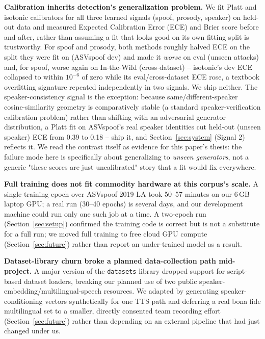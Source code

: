 \documentclass[conference]{IEEEtran}
\begin{document}
\textbf{Calibration inherits detection's generalization problem.} We fit
Platt and isotonic calibrators for all three learned signals (spoof,
prosody, speaker) on held-out data and measured Expected Calibration
Error (ECE) and Brier score before and after, rather than assuming a fit
that looks good on its own fitting split is trustworthy. For spoof and
prosody, both methods roughly halved ECE on the split they were fit on
(ASVspoof dev) and made it \emph{worse} on eval (unseen attacks) and,
for spoof, worse again on In-the-Wild (cross-dataset) -- isotonic's dev
ECE collapsed to within $10^{-6}$ of zero while its eval/cross-dataset
ECE rose, a textbook overfitting signature repeated independently in two
signals. We ship neither. The speaker-consistency signal is the
exception: because same/different-speaker cosine-similarity geometry is
comparatively stable (a standard speaker-verification calibration
problem) rather than shifting with an adversarial generator distribution,
a Platt fit on ASVspoof's real speaker identities cut held-out (unseen
speaker) ECE from 0.39 to 0.18 -- ship it, and Section~\ref{sec:system}
(Signal 2) reflects it. We read the contrast itself as evidence for this
paper's thesis: the failure mode here is specifically about generalizing
to \emph{unseen generators}, not a generic "these scores are just
uncalibrated" story that a fit would fix everywhere.

\textbf{Full training does not fit commodity hardware at this corpus's
scale.} A single training epoch over ASVspoof 2019 LA took 50--57
minutes on our 6\,GB laptop GPU; a real run (30--40 epochs) is several
days, and our development machine could run only one such job at a
time. A two-epoch run (Section~\ref{sec:setup}) confirmed the training
code is correct but is not a substitute for a full run; we moved
full training to free cloud GPU compute (Section~\ref{sec:future})
rather than report an under-trained model as a result.

\textbf{Dataset-library churn broke a planned data-collection path
mid-project.} A major version of the \texttt{datasets} library dropped
support for script-based dataset loaders, breaking our planned use of
two public speaker-embedding/multilingual-speech resources. We adapted
by generating speaker-conditioning vectors synthetically for one TTS
path and deferring a real bona fide multilingual set to a smaller,
directly consented team recording effort (Section~\ref{sec:future})
rather than depending on an external pipeline that had just changed
under us.
\end{document}
